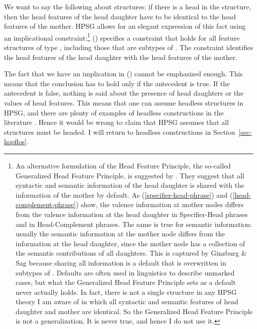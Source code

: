 \documentclass[output=paper
  ,nobabel
  ,draftmode
  ,uniformtopskip %
  ,colorlinks, citecolor=brown
]{langscibook}
\begin{document}
We want to say the following about structures: if there is a head in the structure, then the head
features of the head daughter have to be identical to the head features of the mother. HPSG allows
for an elegant expression of this fact using an implicational constraint:\footnote{%
  An alternative formulation of the Head Feature Principle, the so-called Generalized Head Feature
  Principle, is suggested by \citet[]{GSag2000a-u}. They suggest that all syntactic and semantic
  information of the head daughter is shared with the information of the mother by default. As
  (\ref{specifier-head-phrase}) and (\ref{head-complement-phrase}) show,
  the valence information at mother nodes differs from the valence information at the head daughter
  in Specifier-Head phrases and in Head-Complement phrases. The same is true for semantic
  information: usually the semantic information at the mother node differs from the information at
  the head daughter, since the mother node has a collection of the semantic contributions of all
  daughters. This is captured by Ginzburg \& Sag because sharing all information is a default that
  is overwritten in subtypes of . Defaults are often used in linguistics to
  describe unmarked cases, but what the Generalized Head Feature Principle sets as a default never actually holds. In fact,
  there is not a single structure in any HPSG theory I am aware of in which all syntactic and
  semantic features of head daughter and mother are identical. So the Generalized Head Feature
  Principle is not a generalization. It is never true, and hence I do not use it. 
}
\ea
{} \impl {}
\z
() specifies a constraint that holds for all feature structures of type ,
including those that are subtypes of . The constraint identifies the head
features of the head daughter with the head features of the mother.

The fact that we have an implication in () cannot be emphasized enough. This means that the
conclusion has to hold only if the antecedent is true. If the antecedent is false, nothing is said
about the presence of head daughters or the values of head features. This means that one can assume
headless structures in HPSG, and there are plenty of examples of headless constructions in the
literature \parencites{Mueller99b}[Chapter~10]{Mueller99a}. Hence it would be wrong to claim that HPSG assumes that all
structures must be headed. I will return to headless constructions in Section~\ref{sec-kopflos}.
\end{document}
